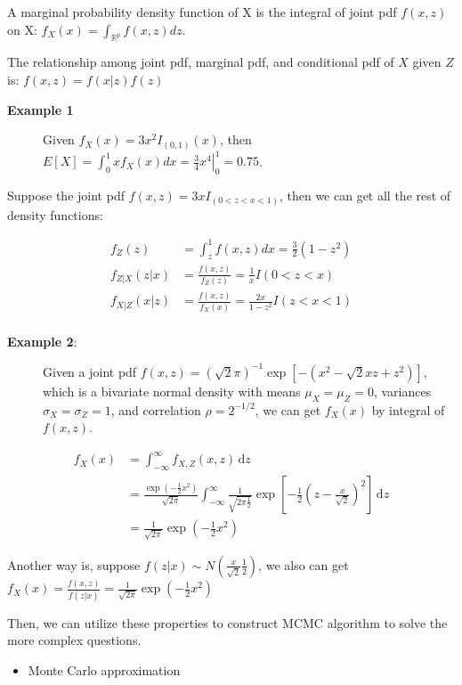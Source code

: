 \documentclass[12pt]{article}
\providecommand{\tightlist}{%
  \setlength{\itemsep}{0pt}\setlength{\parskip}{0pt}}
\begin{document}
A marginal probability density function of X is the integral of joint
pdf \(f(x,z)\) on X: \(f_{X}(x)=\int_{\mathbb{R}^p} f(x,z)dz\).

The relationship among joint pdf, marginal pdf, and conditional pdf of
\(X\) given \(Z\) is: \(f(x,z)=f(x|z)f(z)\)

\begin{description}
\item[\textbf{Example 1}]
Given \(f_{X}(x)=3x^{2}I_{(0,1)}(x)\), then
\(E[X]=\int_{0}^{1} xf_{X}(x)dx=\left.\frac34x^4\right|_0^1=0.75\).
\end{description}

Suppose the joint pdf \(f(x,z)=3xI_{(0<z<x<1)}\), then we can get all
the rest of density functions:

\[\begin{aligned}
f_Z(z)&=\int_{z}^{1} f(x,z)dx =\frac32(1-z^2)\\
f_{Z|X}(z|x)&=\frac{f(x,z)}{f_Z(z)}=\frac1{x}I(0<z<x)\\
f_{X|Z}(x|z)&=\frac{f(x,z)}{f_X(x)}=\frac{2x}{1-z^2}I(z<x<1)\\
\end{aligned}\]

\begin{description}
\item[\textbf{Example 2}:]
Given a joint pdf
\(f(x,z)=(\sqrt{2}\pi)^{-1}\exp\left[-(x^2-\sqrt{2}xz+z^2)\right]\),
which is a bivariate normal density with means \(\mu_X=\mu_Z=0\),
variances \(\sigma_X=\sigma_Z=1\), and correlation \(\rho=2^{-1/2}\), we
can get \(f_{X}(x)\) by integral of \(f(x,z)\).
\end{description}

\[\begin{aligned}
f_{X}(x)&=\int_{-\infty}^\infty f_{X,Z}(x,z)\,\mathrm dz \\
&= \frac{\exp(-\frac12x^2)}{\sqrt{2\pi}}\int_{-\infty}^\infty \frac{1}{\sqrt{2\pi\frac12}}\exp\left[-\frac12(z-\frac{x}{\sqrt{2}})^2\right]\,\mathrm dz \\
&= \frac{1}{\sqrt{2\pi}}\exp(-\frac12x^2)
\end{aligned}\]

Another way is, suppose \(f(z|x)\sim N(\frac{x}{\sqrt{2}}\frac12)\), we
also can get
\(f_{X}(x)=\frac{f(x,z)}{f(z|x)}=\frac{1}{\sqrt{2\pi}}\exp{(-\frac12x^2)}\)

Then, we can utilize these properties to construct MCMC algorithm to
solve the more complex questions.

\begin{itemize}
\tightlist
\item
  Monte Carlo approximation
\end{itemize}
\end{document}
